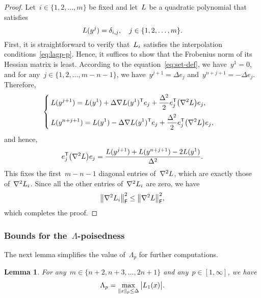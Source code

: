 \documentclass[draft]{article}
\numberwithin{equation}{section}
\theoremstyle{definition}
\theoremstyle{plain}
\newtheorem{lemma}{Lemma}[section]
\newcommand*{\abs}[2][]{#1\lvert#2#1\rvert}
\newcommand*{\lagp}[1][]{L\ifblank{#1}{}{_{#1}}}
\newcommand*{\norm}[2][]{#1\lVert#2#1\rVert}
\newcommand*{\set}[2][]{#1\{#2#1\}}
\newcommand*{\T}{\mathsf{T}}
\begin{document}
\begin{proof}
    Let~$i \in \set{1, 2, \dots, m}$ be fixed and let~$\lagp$ be a quadratic polynomial that satisfies
    \begin{equation}
        \label{eq:lagp-p}
        \lagp(y^j) = \delta_{i, j}, \quad j \in \set{1, 2, \dots, m}.
    \end{equation}
    First, it is straightforward to verify that~$\lagp[i]$ satisfies the interpolation conditions~\eqref{eq:lagp-p}.
    Hence, it suffices to show that the Frobenius norm of its Hessian matrix is least.
    According to the equation~\eqref{eq:set-def}, we have~$y^1 = 0$, and for any~$j \in \set{1, 2, \dots, m - n - 1}$, we have~$y^{j + 1} = \Delta e_j$ and~$y^{n + j + 1} = -\Delta e_j$.
    Therefore,
    \begin{equation*}
        \begin{cases}
            \displaystyle \lagp(y^{j + 1}) = \lagp(y^1) + \Delta \nabla \lagp(y^1)^{\T} e_j + \frac{\Delta^2}{2} e_j^{\T} \big(\nabla^2 \lagp \big) e_j,\\[2ex]
            \displaystyle \lagp(y^{n + j + 1}) = \lagp(y^1) - \Delta \nabla \lagp(y^1)^{\T} e_j + \frac{\Delta^2}{2} e_j^{\T} \big(\nabla^2 \lagp \big) e_j,
        \end{cases}
    \end{equation*}
    and hence,
    \begin{equation*}
        e_j^{\T} \big(\nabla^2 \lagp \big) e_j = \frac{\lagp(y^{j + 1}) + \lagp(y^{n + j + 1}) - 2 \lagp(y^1)}{\Delta^2}.
    \end{equation*}
    This fixes the first~$m - n - 1$ diagonal entries of~$\nabla^2 \lagp$, which are exactly those of~$\nabla^2 \lagp[i]$.
    Since all the other entries of~$\nabla^2 \lagp[i]$ are zero, we have
    \begin{equation*}
        \norm[\big]{\nabla^2 \lagp[i]}_{\mathsf{F}}^2 \le \norm[\big]{\nabla^2 \lagp}_{\mathsf{F}}^2,
    \end{equation*}
    which completes the proof.
\end{proof}

\subsubsection{Bounds for the~\texorpdfstring{$\Lambda$}{\textLambda}-poisedness}

The next lemma simplifies the value of~$\Lambda_p$ for further computations.

\begin{lemma}
    \label{lem:lambda-p}
    For any~$m \in \set{n + 2, n + 3, \dots, 2n + 1}$ and any~$p \in [1, \infty]$, we have
    \begin{equation}
        \label{eq:lambda-p}
        \Lambda_p = \max_{\norm{x}_p \le \Delta} \abs[\big]{\lagp[1](x)}.
    \end{equation}
\end{lemma}
\end{document}
